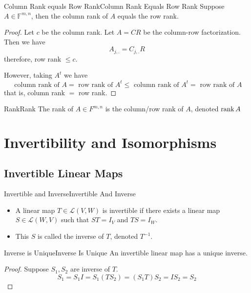 \documentclass[../main.tex]{subfiles}
\begin{document}
\begin{theorem}{Column Rank equals Row Rank}{Column Rank Equals Row Rank}
Suppose $A\in \mathbb{F}^{m,n}$, then the column rank of $A$ equals the row rank.
\end{theorem}
\begin{proof}
Let $c$ be the column rank. Let $A=CR$ be the column-row factorization. Then we have
\begin{equation*}
A_{j,.} = C_{j,.}R
\end{equation*}
therefore, row rank $\leq c$.

However, taking $A^t$ we have
\begin{equation*}
\text{ column rank of }A = \text{ row rank of }A^t \leq \text{ column rank of }A^t = \text{ row rank of }A
\end{equation*}
that is, column rank $=$ row rank.
\end{proof}

\begin{definition}{Rank}{Rank}
The rank of $A\in F^{m,n}$ is the column/row rank of $A$, denoted $\operatorname{rank} A$
\end{definition}


\section{Invertibility and Isomorphisms}
\subsection{Invertible Linear Maps}
\begin{definition}{Invertible and Inverse}{Invertible And Inverse}
\begin{itemize}
\item A linear map $T\in \mathscr{L}(V,W)$ is invertible if there exists a linear map $S\in \mathscr{L}(W,V)$ such that $ST=I_{V}$ and $TS=I_{W}$.
\item This $S$ is called the inverse of $T$, denoted $T^{-1}$.
\end{itemize}
\end{definition}
\begin{theorem}{Inverse is Unique}{Inverse Is Unique}
An invertible linear map has a unique inverse.
\end{theorem}
\begin{proof}
Suppose $S_1,S_2$ are inverse of $T$.
\begin{equation*}
S_1=S_1I = S_1(TS_2) = (S_1T)S_2 = IS_2=S_2
\end{equation*}
\end{proof}
\end{document}
